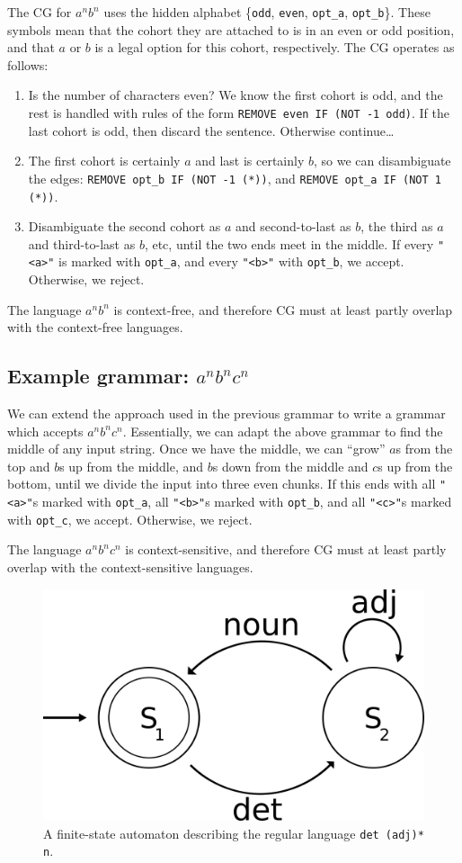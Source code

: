\documentclass[11pt]{article}
\def\t#1{\texttt{#1}}
\begin{document}
The CG for $a^nb^n$ uses the hidden alphabet \{\t{odd}, \t{even}, \t{opt\_a},
\t{opt\_b}\}. These symbols mean that the cohort they are attached to is in an
even or odd position, and that $a$ or $b$ is a legal option for this cohort,
respectively. The CG operates as follows: 
\begin{enumerate}
\item
  Is the number of characters even? We know the first cohort is odd, and the
  rest is handled with rules of the form \t{REMOVE even IF (NOT -1 odd)}. If the
  last cohort is odd, then discard the sentence. Otherwise continue\dots
\item
  The first cohort is certainly $a$ and last is certainly $b$, so we can
  disambiguate the edges: 
  \t{REMOVE opt\_b IF (NOT -1 (*))}, and \t{REMOVE opt\_a IF (NOT 1 (*))}. 
\item
  Disambiguate the second cohort as $a$ and second-to-last as $b$, the third as
  $a$ and third-to-last as $b$, etc, until the two ends meet in the middle. If
  every \t{"<a>"} is marked with \t{opt\_a}, and every \t{"<b>"} with
  \t{opt\_b}, we accept. Otherwise, we reject.  
\end{enumerate}
The language $a^nb^n$ is context-free, and therefore CG must at least partly
overlap with the context-free languages.


\subsection{Example grammar: $a^nb^nc^n$}
We can extend the approach used in the previous grammar to write a grammar which
accepts $a^nb^nc^n$. Essentially, we can adapt the above grammar to find the
middle of any input string. Once we have the middle, we can ``grow'' $a$s from
the top and $b$s up from the middle, and $b$s down from the middle and $c$s up
from the bottom, until we divide the input into three even chunks.
If this ends with all \t{"<a>"}s marked with \t{opt\_a}, all \t{"<b>"}s marked
with \t{opt\_b}, and all \t{"<c>"}s marked with \t{opt\_c}, we accept.
Otherwise, we reject.

The language $a^nb^nc^n$ is context-sensitive, and therefore CG must at least
partly overlap with the context-sensitive languages. 


\begin{figure}[t]
  \centering
  \includegraphics[width=0.6\linewidth]{fsa.png}
  \caption{A finite-state automaton describing the regular language \t{det
      (adj)* n}.}
 \label{fig:fsa}
\end{figure}
\end{document}
